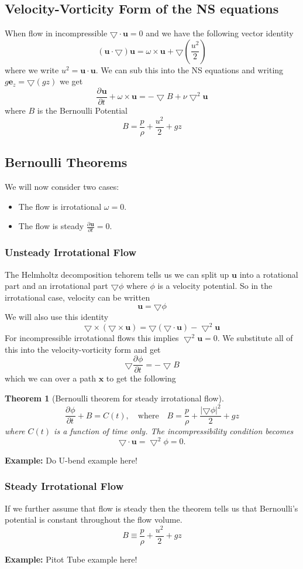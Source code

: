 \documentclass[11pt]{article}
\newcommand*{\pd}[3][]{\ensuremath{\frac{\partial^{#1} {#2}}{\partial {#3}^{#1}}}}
\newcommand{\grad}{\bigtriangledown}
\newcommand{\mv}[1]{\bm{#1}}
\newcommand{\mdf}[1]{{\color{red}#1}}
\newcommand{\abs}[1]{\left|#1\right|}
\newtheorem{theorem}{Theorem}[section]
\newenvironment{eg}
{\begin{mdframed}[backgroundcolor=mylg, roundcorner=5pt, linewidth=0pt]\textbf{Example: }\normalfont}
    {\end{mdframed}}
\begin{document}
\subsection{Velocity-Vorticity Form of the NS equations}
When flow in incompressible $\grad\cdot\mv{u}=0$ and we have the following vector identity
$$(\mv{u}\cdot\grad)\mv{u}=\omega\times\mv{u}+\grad\left(\frac{u^2}{2}\right)$$
where we write $u^2=\mv{u}\cdot\mv{u}$. We can sub this into the NS equations and writing $g\mv{e}_z=\grad(gz)$ we get
$$\pd{\mv{u}}{t}+\omega\times\mv{u}=-\grad B+\nu\grad^2\mv{u}$$
where $B$ is the \mdf{Bernoulli Potential}
$$B=\frac{p}{\rho}+\frac{u^2}{2}+gz$$
\subsection{Bernoulli Theorems}
We will now consider two cases:
\begin{itemize}
	\item The flow is irrotational $\omega = 0$.
	\item The flow is steady $\pd{\mv{u}}{t}=0$.
\end{itemize}
\subsubsection{Unsteady Irrotational Flow}
The Helmholtz decomposition tehorem tells us we can split up $\mv{u}$ into a rotational part and an irrotational part $\grad\phi$ where $\phi$ is a velocity potential. So in the irrotational case, velocity can be written
$$\mv{u}=\grad\phi$$
We will also use this identity
$$\grad\times(\grad\times\mv{u})=\grad(\grad\cdot\mv{u})-\grad^2\mv{u}$$
For incompressible irrotational flows this implies $\grad^2\mv{u}=0$.
We substitute all of this into the velocity-vorticity form and get
$$\grad\pd{\phi}{t}=-\grad B$$
which we can over a path $\mv{x}$ to get the following
\begin{theorem}[Bernoulli theorem for steady irrotational flow]
	$$\pd{\phi}{t}+B=C(t), \quad \text{where} \quad B=\frac{p}{\rho}+\frac{\abs{\grad\phi}^2}{2}+gz$$
	where $C(t)$ is a function of time only. The incompressibility condition becomes
	$$\grad\cdot\mv{u}=\grad^2\phi=0.$$
\end{theorem}

\begin{eg}
Do U-bend example here!
\end{eg}

\subsubsection{Steady Irrotational Flow}
If we further assume that flow is steady then the theorem tells us that Bernoulli's potential is constant throughout the flow volume.
$$B\equiv \frac{p}{\rho}+\frac{u^2}{2}+gz$$
\begin{eg}
Pitot Tube example here!
\end{eg}
\end{document}
